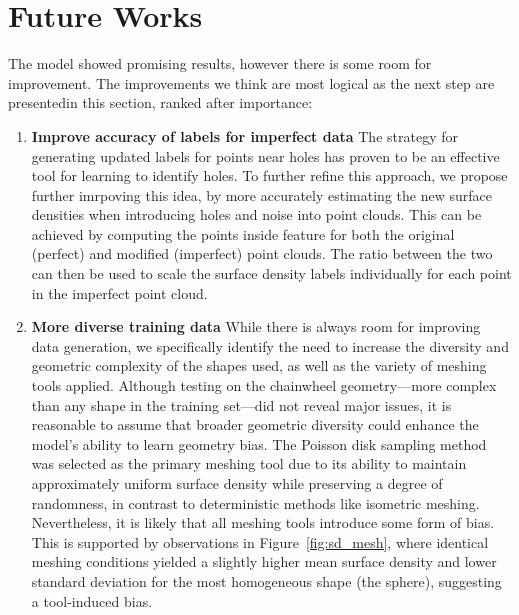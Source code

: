 \section{Future Works}
The model showed promising results, however there is some room for improvement. The improvements we think are most logical as the next step are presentedin this section, ranked after importance:

\begin{enumerate}
  \item \textbf{Improve accuracy of labels for imperfect data}
  The strategy for generating updated labels for points near holes has proven to be an effective tool for learning to identify holes. To further refine this approach, we propose further imrpoving this idea, by more accurately estimating the new surface densities when introducing holes and noise into point clouds. This can be achieved by computing the points inside feature for both the original (perfect) and modified (imperfect) point clouds. The ratio between the two can then be used to scale the surface density labels individually for each point in the imperfect point cloud.

  \item \textbf{More diverse training data}
  While there is always room for improving data generation, we specifically identify the need to increase the diversity and geometric complexity of the shapes used, as well as the variety of meshing tools applied. Although testing on the chainwheel geometry—more complex than any shape in the training set—did not reveal major issues, it is reasonable to assume that broader geometric diversity could enhance the model’s ability to learn geometry bias. The Poisson disk sampling method was selected as the primary meshing tool due to its ability to maintain approximately uniform surface density while preserving a degree of randomness, in contrast to deterministic methods like isometric meshing. Nevertheless, it is likely that all meshing tools introduce some form of bias. This is supported by observations in Figure~\ref{fig:sd_mesh}, where identical meshing conditions yielded a slightly higher mean surface density and lower standard deviation for the most homogeneous shape (the sphere), suggesting a tool-induced bias.
  

\end{enumerate}
